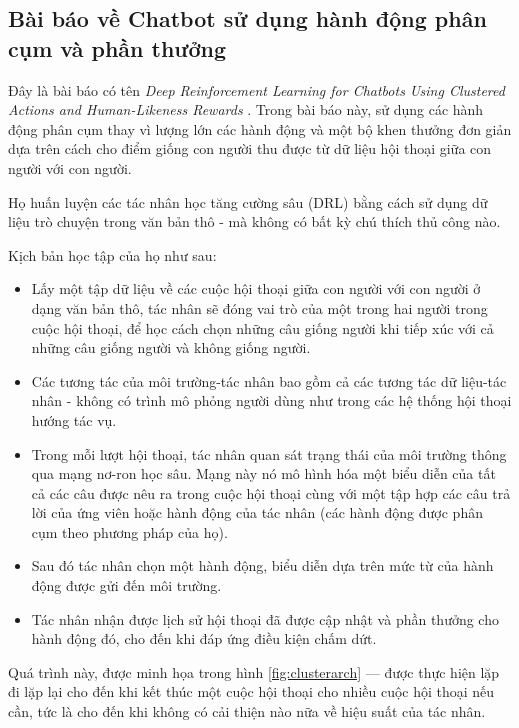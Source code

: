 \subsection{Bài báo về Chatbot sử dụng hành động phân cụm và phần thưởng}
Đây là bài báo có tên \textit{Deep Reinforcement Learning for Chatbots Using Clustered Actions and Human-Likeness Rewards} \cite{clustered}. Trong bài báo này, sử dụng các hành động phân cụm thay vì lượng lớn các hành động và một bộ khen thưởng đơn giản dựa trên cách cho điểm giống con người thu được từ dữ liệu hội thoại giữa con người với con người.

Họ huấn luyện các tác nhân học tăng cường sâu (DRL) bằng cách sử dụng dữ liệu trò chuyện trong văn bản thô - mà không có bất kỳ chú thích thủ công nào.

Kịch bản học tập của họ như sau:

\begin{itemize}
    \item Lấy một tập dữ liệu về các cuộc hội thoại giữa con người với con người ở dạng văn bản thô, tác nhân sẽ đóng vai trò của một trong hai người trong cuộc hội thoại, để học cách chọn những câu giống người khi tiếp xúc với cả những câu giống người và không giống người.
    \item Các tương tác của môi trường-tác nhân bao gồm cả các tương tác dữ liệu-tác nhân - không có trình mô phỏng người dùng như trong các hệ thống hội thoại hướng tác vụ.
    \item Trong mỗi lượt hội thoại, tác nhân quan sát trạng thái của môi trường thông qua mạng nơ-ron học sâu. Mạng này nó mô hình hóa một biểu diễn của tất cả các câu được nêu ra trong cuộc hội thoại cùng với một tập hợp các câu trả lời của ứng viên hoặc hành động của tác nhân (các hành động được phân cụm theo phương pháp của họ).
    \item Sau đó tác nhân chọn một hành động, biểu diễn dựa trên mức từ của hành động được gửi đến môi trường.
    \item Tác nhân nhận được lịch sử hội thoại đã được cập nhật và phần thưởng cho hành động đó, cho đến khi đáp ứng điều kiện chấm dứt.
\end{itemize}

Quá trình này, được minh họa trong hình \ref{fig:clusterarch} — được thực hiện lặp đi lặp lại cho đến khi kết thúc một cuộc hội thoại cho nhiều cuộc hội thoại nếu cần, tức là cho đến khi không có cải thiện nào nữa về hiệu suất của tác nhân.

